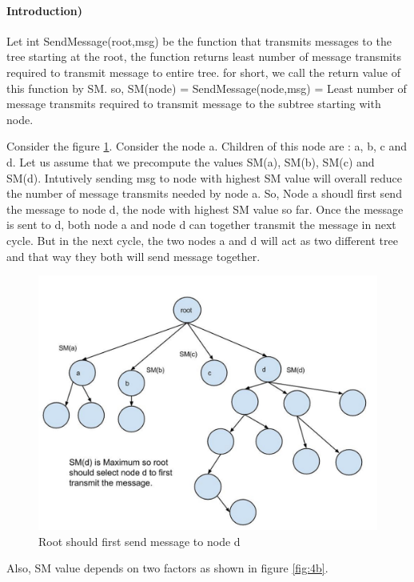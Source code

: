 \paragraph{Introduction)} 
Let int  SendMessage(root,msg) be the function that transmits messages to the tree starting at the root, the function returns least number of message transmits required to transmit message to entire tree. 
for short, we call the return value of this function by SM. 
so, SM(node) = SendMessage(node,msg) = Least number of message transmits required to transmit message to the subtree starting with node. 

Consider the figure \ref{fig:4a}. Consider the node a. Children of this node are : a, b, c and d. Let us assume that we precompute the values SM(a), SM(b), SM(c) and SM(d). Intutively sending msg to node with highest SM value will overall reduce the number of message transmits needed by node a. So, Node a shoudl first send the message to node d, the node with highest SM value so far. Once the message is sent to d,  both node a and node d can together transmit the message in next cycle. But in the next cycle, the two nodes a and d will act as two different tree and that way they both will send message together.

\begin{figure}[4a]
    \centering
    \includegraphics[scale=0.10]{4a}
    \caption{Root should first send message to node d}
    \label{fig:4a}
\end{figure}


Also, SM value depends on two factors as shown in figure \ref{fig:4b}. 

